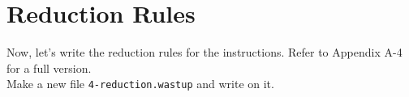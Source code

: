 \documentclass{article}
\newenvironment{lcverbatim}
 {\SaveVerbatim{cverb}}
 {\endSaveVerbatim
  \flushleft\fboxrule=0pt\fboxsep=.5em
  \colorbox{cverbbg}{%
    \makebox[\dimexpr\linewidth-2\fboxsep][l]{\BUseVerbatim{cverb}}%
  }
  \endflushleft
}
\newcommand\K[1]{\texttt{#1}}
\begin{document}
\section{Reduction Rules}
Now, let's write the reduction rules for the instructions. Refer to Appendix A-4 for a full version. \\
Make a new file \K{4-reduction.wastup} and write on it.
\end{document}

